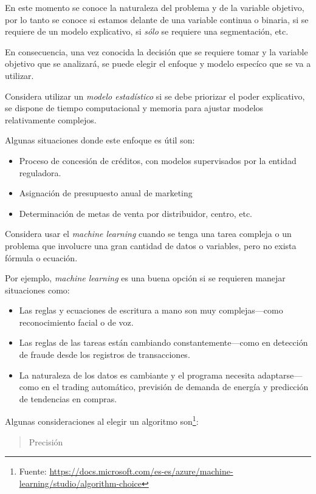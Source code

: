 \documentclass[]{book}
\providecommand{\tightlist}{%
  \setlength{\itemsep}{0pt}\setlength{\parskip}{0pt}}
\let\rmarkdownfootnote\footnote%
\def\footnote{\protect\rmarkdownfootnote}
\begin{document}
En este momento se conoce la naturaleza del problema y de la variable objetivo, por lo tanto se conoce si estamos delante de una variable continua o binaria, si se requiere de un modelo explicativo, si \emph{sólo} se requiere una segmentación, etc.

En consecuencia, una vez conocida la decisión que se requiere tomar y la variable objetivo que se analizará, se puede elegir el enfoque y modelo especíco que se va a utilizar.

Considera utilizar un \emph{modelo estadístico} si se debe priorizar el poder explicativo, se dispone de tiempo computacional y memoria para ajustar modelos relativamente complejos.

Algunas situaciones donde este enfoque es útil son:

\begin{itemize}
\tightlist
\item
  Proceso de concesión de créditos, con modelos supervisados por la entidad reguladora.
\item
  Asignación de presupuesto anual de marketing
\item
  Determinación de metas de venta por distribuidor, centro, etc.
\end{itemize}

Considera usar el \emph{machine learning} cuando se tenga una tarea compleja o un problema que involucre una gran cantidad de datos o variables, pero no exista fórmula o ecuación.

Por ejemplo, \emph{machine learning} es una buena opción si se requieren manejar situaciones como:

\begin{itemize}
\tightlist
\item
  Las reglas y ecuaciones de escritura a mano son muy complejas---como reconocimiento facial o de voz.
\item
  Las reglas de las tareas están cambiando constantemente---como en detección de fraude desde los registros de transacciones.
\item
  La naturaleza de los datos es cambiante y el programa necesita adaptarse---como en el trading automático, previsión de demanda de energía y predicción de tendencias en compras.
\end{itemize}

Algunas consideraciones al elegir un algoritmo son\footnote{Fuente: \url{https://docs.microsoft.com/es-es/azure/machine-learning/studio/algorithm-choice}}:

\begin{quote}
Precisión
\end{quote}
\end{document}
